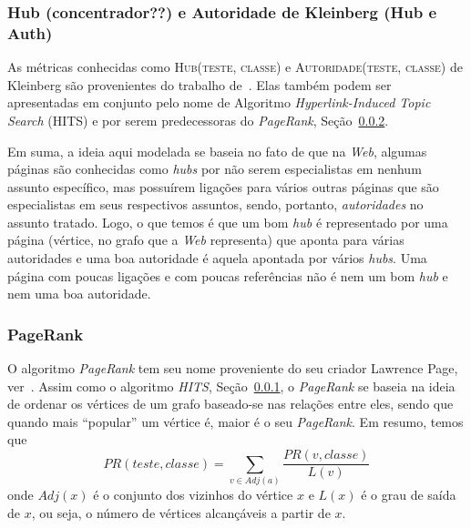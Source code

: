 \subsubsection{Hub (concentrador??) e Autoridade de Kleinberg (Hub e Auth)}
\label{subsubsection::hub}
As métricas conhecidas como \textsc{Hub(teste, classe)} e \textsc{Autoridade(teste, classe)} de Kleinberg são provenientes do trabalho de~\cite{Kleinberg99}. Elas também podem ser apresentadas em conjunto pelo nome de Algoritmo \textit{Hyperlink-Induced Topic Search} (HITS) e por serem predecessoras do \textit{PageRank}, Seção~\ref{subsubsection::pagerank}. 

Em suma, a ideia aqui modelada se baseia no fato de que na \textit{Web}, algumas páginas são conhecidas como \textit{hubs} por não serem especialistas em nenhum assunto específico, mas possuírem ligações para vários outras páginas que são especialistas em seus respectivos assuntos, sendo, portanto, \textit{autoridades} no assunto tratado. Logo, o que temos é que um bom \textit{hub} é representado por uma página (vértice, no grafo que a \textit{Web} representa) que aponta para várias autoridades e uma boa autoridade é aquela apontada por vários \textit{hubs}. Uma página com poucas ligações e com poucas referências não é nem um bom \textit{hub} e nem uma boa autoridade.

\subsubsection{PageRank}
\label{subsubsection::pagerank}

O algoritmo \textit{PageRank} tem seu nome proveniente do seu criador Lawrence Page, ver~\cite{Page98}. Assim como o algoritmo \textit{HITS}, Seção~\ref{subsubsection::hub}, o \textit{PageRank} se baseia na ideia de ordenar os vértices de um grafo baseado-se nas relações entre eles, sendo que quando mais ``popular'' um vértice é, maior é o seu \textit{PageRank}. Em resumo, temos que
\begin{equation}\label{eqn::pagerank}
PR(teste, classe) = \sum_{v \in Adj(a)} \frac{PR(v, classe)}{L(v)}
\end{equation}
onde $Adj(x)$ é o conjunto dos vizinhos do vértice $x$ e $L(x)$ é o grau de saída de $x$, ou seja, o número de vértices alcançáveis a partir de $x$.

